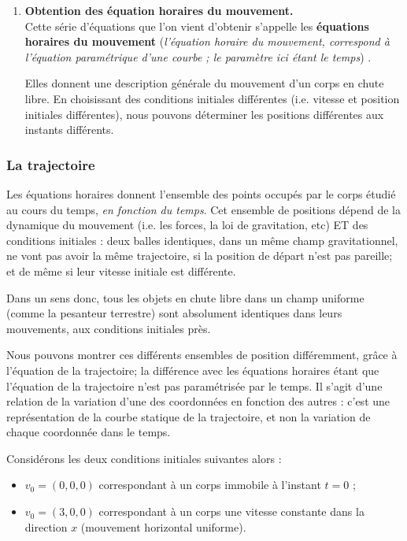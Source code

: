 \documentclass[11pt,a4paper]{article}
\begin{document}
\begin{enumerate}
    \item \textbf{Obtention des équation horaires du mouvement. }\\
    Cette série d’équations que l'on vient d'obtenir s’appelle les \textbf{équations horaires du mouvement} (\textit{l'équation horaire du mouvement, correspond à l’équation paramétrique d'une courbe ; le paramètre ici étant le temps}) . 
    
    Elles donnent une description générale du mouvement d’un corps en chute libre. En choisissant des conditions initiales différentes (i.e. vitesse et position initiales différentes), nous pouvons déterminer les positions différentes aux instants différents. 
\end{enumerate}

\subsubsection{La trajectoire}

Les équations horaires donnent l'ensemble des points occupés par le corps étudié au cours du temps, \textit{en fonction du temps}. Cet ensemble de positions dépend de la dynamique du mouvement (i.e. les forces, la loi de gravitation, etc) ET des conditions initiales : deux balles identiques, dans un même champ gravitationnel, ne vont pas avoir la même trajectoire, si la position de départ n'est pas pareille; et de même si leur vitesse initiale est différente. 

Dans un sens donc, tous les objets en chute libre dans un champ uniforme (comme la pesanteur terrestre) sont absolument identiques dans leurs mouvements, aux conditions initiales près. 

Nous pouvons montrer ces différents ensembles de position différemment, grâce à l'équation de la trajectoire; la différence avec les équations horaires étant que l'équation de la trajectoire n'est pas paramétrisée par le temps. Il s'agit d'une relation de la variation d'une des coordonnées en fonction des autres : c'est une représentation de la courbe statique de la trajectoire, et non la variation de chaque coordonnée dans le temps. 

Considérons les deux conditions initiales suivantes alors : 
\begin{itemize}
    \item $v_0 = (0,0,0) $ correspondant à un corps immobile à l'instant $t=0$ ; 
    \item $v_0 = (3,0,0) $ correspondant à un corps une vitesse constante dans la direction $x$ (mouvement horizontal uniforme). 
\end{itemize}
\end{document}
